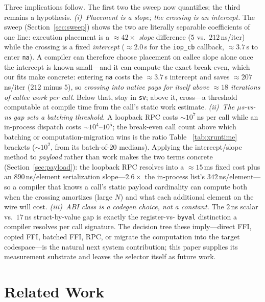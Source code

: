 \documentclass[conference]{IEEEtran}
\newcommand{\code}[1]{\texttt{#1}}
\begin{document}
Three implications follow. The first two the sweep now quantifies; the third
remains a hypothesis. \emph{(i)~Placement is a slope; the crossing is an
intercept.} The sweep (Section~\ref{sec:sweep}) shows the two are literally
separable coefficients of one line: execution placement is a
$\approx$$42\times$ \emph{slope} difference ($5$ vs.\ $212$\,ns/iter) while the
crossing is a fixed \emph{intercept} ($\approx$$2.0$\,\textmu s for the
\code{iop\_cb} callback, $\approx$$3.7$\,\textmu s to enter \code{na}). A
compiler can therefore choose placement on callee slope alone once the intercept
is known small---and it can compute the exact break-even, which our fits make
concrete: entering \code{na} costs the $\approx$$3.7$\,\textmu s intercept and
saves $\approx$$207$\,ns/iter ($212$ minus $5$), so \emph{crossing into native
pays for itself above $\approx$$18$ iterations of callee work per call}. Below
that, stay in \code{sv}; above it, cross---a threshold computable at compile time
from the call's static work estimate. \emph{(ii)~The $\mu$s-vs-ns gap
sets a batching threshold.} A loopback RPC costs $\sim$$10^{7}$\,ns per call
while an in-process dispatch costs $\sim$$10^{4}$--$10^{5}$; the break-even call
count above which batching or computation-migration wins is the ratio Table~%
\ref{tab:xruntime} brackets ($\sim$$10^2$, from its batch-of-$20$ medians). Applying the intercept/slope method
to \emph{payload} rather than work makes the two terms concrete
(Section~\ref{sec:payload}): the loopback RPC resolves into a $\approx$$15$\,ms
fixed cost plus an $890$\,ns/element serialization slope---$2.6\times$ the
in-process list's $342$\,ns/element---so a compiler that knows a call's static
payload cardinality can compute both when the crossing amortizes (large $N$) and
what each additional element on the wire will cost. \emph{(iii)~ABI class is a codegen choice,
not a constant.} The
$2$\,ns scalar vs.\ $17$\,ns struct-by-value gap is exactly the register-vs-%
\code{byval} distinction a compiler resolves per call signature. The decision
tree these imply---direct FFI, copied FFI, batched FFI, RPC, or migrate the
computation into the target codespace---is the natural next system contribution;
this paper supplies its measurement substrate and leaves the selector itself as
future work.

\section{Related Work}
\label{sec:related}
\end{document}

